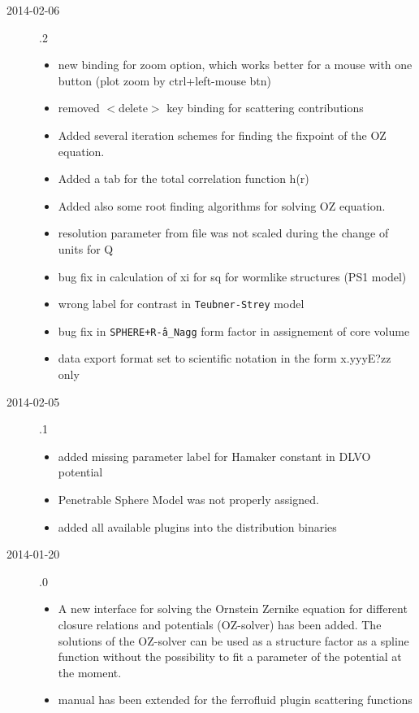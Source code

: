 \begin{description}
\begin{itemize}
    \end{itemize}
    \item[2014-02-06] .2
    \begin{itemize}
        \item new binding for zoom option, which works better for a mouse with one button
              (plot zoom by ctrl+left-mouse btn)
        \item removed $<$delete$>$ key binding for scattering contributions
        \item Added several iteration schemes for finding the fixpoint of the OZ equation.
        \item Added a tab for the total correlation function h(r)
        \item Added also some root finding algorithms for solving OZ equation.
        \item resolution parameter from file was not scaled during the change of units for Q
        \item bug fix in calculation of xi for sq for wormlike structures  (PS1 model)
        \item wrong label for contrast in \texttt{Teubner-Strey} model
        \item bug fix in \texttt{SPHERE+R\^-a\_Nagg} form factor in assignement of core volume
        \item data export format set to scientific notation in the form x.yyyE?zz only
    \end{itemize}
    \item[2014-02-05] .1
    \begin{itemize}
      \item added missing parameter label for Hamaker constant in DLVO potential
      \item Penetrable Sphere Model was not properly assigned.
      \item added all available plugins into the distribution binaries
    \end{itemize}
    \item[2014-01-20] .0
    \begin{itemize}
      \item A new interface for solving the Ornstein Zernike equation for different
            closure relations and potentials (OZ-solver) has been added. The solutions
            of the OZ-solver can be used as a structure factor as a spline function without the possibility to fit a parameter of the potential at the moment.
      \item manual has been extended for the ferrofluid plugin scattering functions

\end{itemize}
\end{description}
